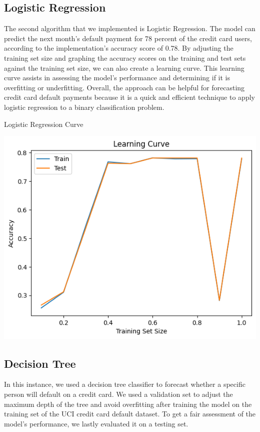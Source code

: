 \documentclass[nohyperref]{article}
\theoremstyle{plain}
\theoremstyle{definition}
\theoremstyle{remark}
\begin{document}
\subsection{Logistic Regression}

The second algorithm that we implemented is Logistic Regression. The model can predict the next month's default payment for 78 percent of the credit card users, according to the implementation's accuracy score of 0.78. By adjusting the training set size and graphing the accuracy scores on the training and test sets against the training set size, we can also create a learning curve. This learning curve assists in assessing the model's performance and determining if it is overfitting or underfitting. Overall, the approach can be helpful for forecasting credit card default payments because it is a quick and efficient technique to apply logistic regression to a binary classification problem.

Logistic Regression Curve

\includegraphics[scale=0.5]{Logistic Regression.png}


\subsection{Decision Tree}

In this instance, we used a decision tree classifier to forecast whether a specific person will default on a credit card. We used a validation set to adjust the maximum depth of the tree and avoid overfitting after training the model on the training set of the UCI credit card default dataset. To get a fair assessment of the model's performance, we lastly evaluated it on a testing set.
\end{document}
